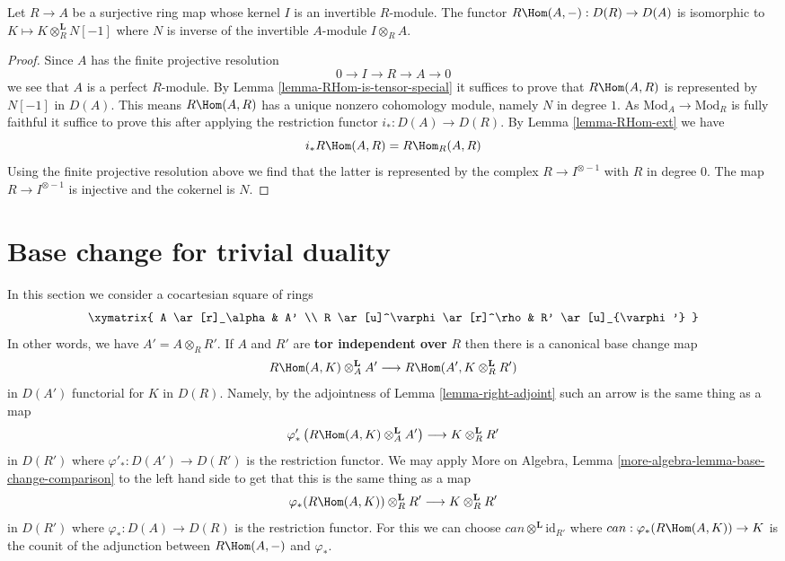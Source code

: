 \begin{lemma}
\label{lemma-compute-for-effective-Cartier-algebraic}
Let $R \to A$ be a surjective ring map whose kernel $I$
is an invertible $R$-module. The functor
$R\Hom(A, -) : D(R) \to D(A)$
is isomorphic to $K \mapsto K \otimes_R^\mathbf{L} N[-1]$
where $N$ is inverse of the invertible $A$-module $I \otimes_R A$.
\end{lemma}

\begin{proof}
Since $A$ has the finite projective resolution
$$
0 \to I \to R \to A \to 0
$$
we see that $A$ is a perfect $R$-module. By
Lemma \ref{lemma-RHom-is-tensor-special} it suffices
to prove that $R\Hom(A, R)$ is represented by $N[-1]$ in $D(A)$.
This means $R\Hom(A, R)$ has a unique nonzero
cohomology module, namely $N$ in degree $1$. As
$\text{Mod}_A \to \text{Mod}_R$ is fully faithful it suffice to prove
this after applying the restriction functor $i_* : D(A) \to D(R)$.
By Lemma \ref{lemma-RHom-ext} we have
$$
i_*R\Hom(A, R) = R\Hom_R(A, R)
$$
Using the finite projective resolution above we find that the latter
is represented by the complex $R \to I^{\otimes -1}$ with $R$
in degree $0$. The map $R \to I^{\otimes -1}$ is injective
and the cokernel is $N$.
\end{proof}





\section{Base change for trivial duality}
\label{section-base-change-trivial-duality}

\noindent
In this section we consider a cocartesian square of rings
$$
\xymatrix{
A \ar[r]_\alpha & A' \\
R \ar[u]^\varphi \ar[r]^\rho & R' \ar[u]_{\varphi'}
}
$$
In other words, we have $A' = A \otimes_R R'$. If $A$ and $R'$
are {\bf tor independent over} $R$ then there is a canonical base change map
\begin{equation}
\label{equation-base-change}
R\Hom(A, K) \otimes_A^\mathbf{L} A'
\longrightarrow
R\Hom(A', K \otimes_R^\mathbf{L} R')
\end{equation}
in $D(A')$ functorial for $K$ in $D(R)$. Namely, by the adjointness
of Lemma \ref{lemma-right-adjoint} such an arrow is the same thing as a map
$$
\varphi'_*\left(R\Hom(A, K) \otimes_A^\mathbf{L} A'\right)
\longrightarrow
K \otimes_R^\mathbf{L} R'
$$
in $D(R')$ where $\varphi'_* : D(A') \to D(R')$ is the restriction functor.
We may apply
More on Algebra, Lemma \ref{more-algebra-lemma-base-change-comparison}
to the left hand side to get that this is the same thing as a map
$$
\varphi_*(R\Hom(A, K)) \otimes_R^\mathbf{L} R'
\longrightarrow
K \otimes_R^\mathbf{L} R'
$$
in $D(R')$ where $\varphi_* : D(A) \to D(R)$ is the restriction functor.
For this we can choose $can \otimes^\mathbf{L} \text{id}_{R'}$
where $can : \varphi_*(R\Hom(A, K)) \to K$ is the
counit of the adjunction between $R\Hom(A, -)$ and $\varphi_*$.

